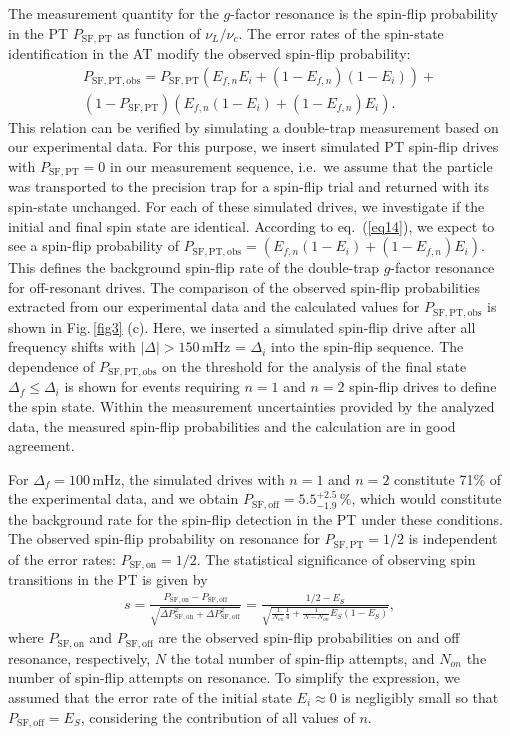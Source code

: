 \documentclass[12pt,preprint%
]{elsarticle}
\begin{document}
The measurement quantity for the $g$-factor resonance is the spin-flip probability in the PT $P_{\mathrm{SF,PT}}$ as function of $\nu_L/\nu_c$. The error rates of the spin-state identification in the AT modify the observed spin-flip probability:
\begin{multline}
P_{\mathrm{SF,PT,obs}} = P_{\mathrm{SF,PT}} (E_{f,n} E_i + (1-E_{f,n})(1-E_i)) + \\
(1 - P_{\mathrm{SF,PT}}) (E_{f,n} (1-E_i) + (1-E_{f,n})E_i).
\label{eq14}
\end{multline}
This relation can be verified by simulating a double-trap measurement based on our experimental data. For this purpose, we insert simulated PT spin-flip drives with $P_{\mathrm{SF,PT}}=0$ in our measurement sequence, i.e.~we assume that the particle was transported to the precision trap for a spin-flip trial and returned with its spin-state unchanged. For each of these simulated drives, we investigate if the initial and final spin state are identical. According to eq.~(\ref{eq14}), we expect to see a spin-flip probability of $P_{\mathrm{SF,PT,obs}}=(E_{f,n} (1-E_i) + (1-E_{f,n})E_i)$. This defines the background spin-flip rate of the double-trap $g$-factor resonance for off-resonant drives. The comparison of the observed spin-flip probabilities extracted from our experimental data and the calculated values for $P_{\mathrm{SF,PT,obs}}$ is shown in Fig.$\,$\ref{fig3} (c). Here, we inserted a simulated spin-flip drive after all frequency shifts with $|\Delta| > 150\,$mHz = $\Delta_i$ into the spin-flip sequence. The dependence of $P_{\mathrm{SF,PT,obs}}$ on the threshold for the analysis of the final state $\Delta_f \leq \Delta_i$ is shown for events requiring $n=1$ and $n=2$ spin-flip drives to define the spin state. Within the measurement uncertainties provided by the analyzed data, the measured spin-flip probabilities and the calculation are in good agreement. 

For $\Delta_f = 100\,$mHz, the simulated drives with $n=1$ and $n=2$ constitute 71$\%$ of the experimental data, and we obtain $P_{\mathrm{SF,off}}= 5.5^{+2.5}_{-1.9}\,\%$, which would constitute the background rate for the spin-flip detection in the PT under these conditions. The observed spin-flip probability on resonance for $P_{\mathrm{SF,PT}}=1/2$ is independent of the error rates: $P_{\mathrm{SF,on}} = 1/2$. The statistical significance of observing spin transitions in the PT is given by
\begin{eqnarray}
s = \frac{P_{\mathrm{SF,on}}-P_{\mathrm{SF,off}}}{\sqrt{\Delta P_{\mathrm{SF,on}}^2+\Delta P_{\mathrm{SF,off}}^2}} 
= \frac{1/2 - E_{S}}{\sqrt{\frac{1}{N_{on}}\frac{1}{4}+\frac{1}{N - N_{on}}E_{S} (1-E_{S})}},
\end{eqnarray}
where $P_{\mathrm{SF,on}}$ and $P_{\mathrm{SF,off}}$ are the observed spin-flip probabilities on and off resonance, respectively, $N$ the total number of spin-flip attempts, and $N_{on}$ the number of spin-flip attempts on resonance. To simplify the expression, we assumed that the error rate of the initial state $E_i \approx 0$ is negligibly small so that $P_{\mathrm{SF,off}} = E_S$, considering the contribution of all values of $n$. 
\end{document}
